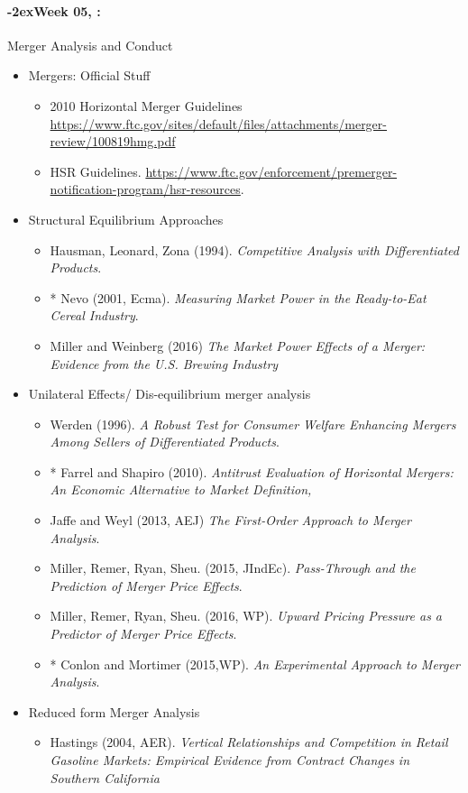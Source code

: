 \documentclass[11pt]{article}
\newcommand{\week}[1]{%
  \paragraph*{\kern-2ex\quad #1, \syldate{\today}:}%
  \ifdim\wd1=\wd\THURSDAY
    \AdvanceDate[7]
  \else
    \AdvanceDate[7]
  \fi%
}
\begin{document}
\week{Week 05} Merger Analysis and Conduct 
\begin{itemize}
\item Mergers: Official Stuff
\begin{itemize}
\item 2010 Horizontal Merger Guidelines \url{https://www.ftc.gov/sites/default/files/attachments/merger-review/100819hmg.pdf}
\item HSR Guidelines. \url{https://www.ftc.gov/enforcement/premerger-notification-program/hsr-resources}.
\end{itemize}
\item Structural Equilibrium Approaches
\begin{itemize}
\item Hausman, Leonard, Zona (1994). \textit{Competitive Analysis with Differentiated Products}.
\item * Nevo (2001, Ecma). \textit{Measuring Market Power in the Ready-to-Eat Cereal Industry}.
\item Miller and Weinberg (2016) \textit{The Market Power Effects of a Merger: Evidence from the U.S. Brewing Industry}
\end{itemize}
\item Unilateral Effects/ Dis-equilibrium merger analysis
\begin{itemize}
\item Werden (1996). \textit{A Robust Test for Consumer Welfare Enhancing
Mergers Among Sellers of Differentiated Products}.
\item * Farrel and Shapiro (2010). \textit{Antitrust Evaluation of Horizontal Mergers: An Economic Alternative to Market Definition,}
\item Jaffe and Weyl (2013, AEJ) \textit{The First-Order Approach to Merger Analysis}.
\item Miller, Remer, Ryan, Sheu. (2015, JIndEc). \textit{Pass-Through and the Prediction of Merger Price Effects}.
\item Miller, Remer, Ryan, Sheu. (2016, WP). \textit{Upward Pricing Pressure as a Predictor of Merger Price Effects}.
\item * Conlon and Mortimer (2015,WP). \textit{An Experimental Approach to Merger Analysis}.
\end{itemize}
\item Reduced form Merger Analysis
\begin{itemize}
\item Hastings (2004, AER). \textit{Vertical Relationships and Competition in Retail Gasoline Markets: Empirical Evidence from Contract Changes in Southern California}

\end{itemize}
\end{itemize}
\end{document}
